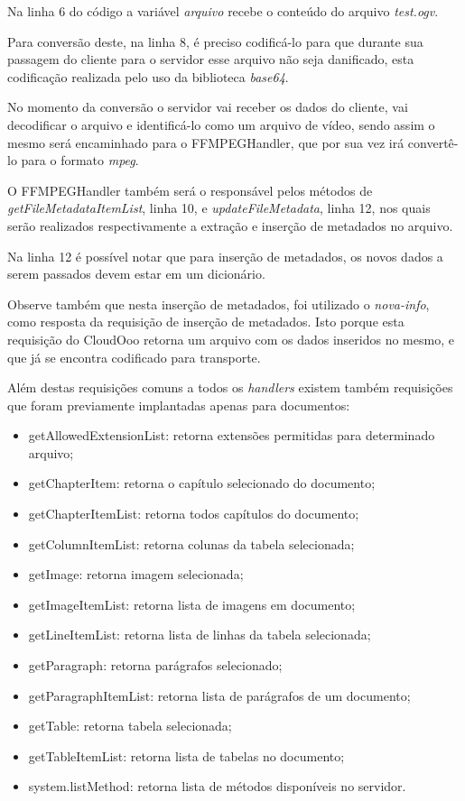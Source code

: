 Na linha 6 do código a variável \textit{arquivo} recebe o conteúdo do arquivo \textit{test.ogv}.

Para conversão deste, na linha 8, é preciso codificá-lo para que durante sua passagem do cliente para o servidor esse arquivo não seja danificado, esta codificação realizada pelo uso da biblioteca \textit{base64}.

No momento da conversão o servidor vai receber os dados do cliente, vai decodificar o arquivo e identificá-lo como um arquivo de vídeo, sendo assim o mesmo será encaminhado para o FFMPEGHandler, que por sua vez irá convertê-lo para o formato \textit{mpeg}.

O FFMPEGHandler também será o responsável pelos métodos de \textit{getFileMetadataItemList}, linha 10, e \textit{updateFileMetadata}, linha 12, nos quais serão realizados respectivamente a extração e inserção de metadados no arquivo.

Na linha 12 é possível notar que para inserção de metadados, os novos dados a serem passados devem estar em um dicionário.

Observe também que nesta inserção de metadados, foi utilizado o \textit{nova-info}, como resposta da requisição de inserção de metadados. Isto porque esta requisição do CloudOoo retorna um arquivo com os dados inseridos no mesmo, e que já se encontra codificado para transporte.

Além destas requisições comuns a todos os \textit{handlers} existem também requisições que foram previamente implantadas apenas para documentos:

\begin{itemize}
    \item{getAllowedExtensionList: retorna extensões permitidas para determinado arquivo;}
    \item{getChapterItem: retorna o capítulo selecionado do documento;}
    \item{getChapterItemList: retorna todos capítulos do documento;}
    \item{getColumnItemList: retorna colunas da tabela selecionada;}
    \item{getImage: retorna imagem selecionada;}
    \item{getImageItemList: retorna lista de imagens em documento;}
    \item{getLineItemList: retorna lista de linhas da tabela selecionada;}
    \item{getParagraph: retorna parágrafos selecionado;}
    \item{getParagraphItemList: retorna lista de parágrafos de um documento;}
    \item{getTable: retorna tabela selecionada;}
    \item{getTableItemList: retorna lista de tabelas no documento;}
    \item{system.listMethod: retorna lista de métodos disponíveis no servidor.}
\end{itemize}

